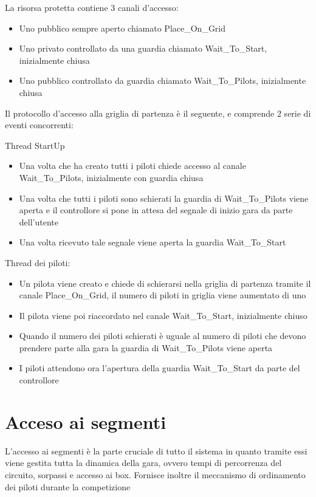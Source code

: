 \documentclass[a4paper,11pt, twoside]{book}
\begin{document}
      La risorsa protetta contiene 3 canali d'accesso:
      \begin{itemize}
	\item Uno pubblico sempre aperto chiamato Place\_On\_Grid
	\item Uno privato controllato da una guardia chiamato  Wait\_To\_Start, inizialmente chiusa
	\item Uno pubblico controllato da guardia chiamato Wait\_To\_Pilots, inizialmente chiusa
      \end{itemize}
      
      Il protocollo d'accesso alla griglia di partenza è il seguente, e comprende 2 serie di eventi
      concorrenti:
      
      Thread StartUp
      \begin{itemize}
	\item Una volta che ha creato tutti i piloti chiede accesso al canale Wait\_To\_Pilots,
	      inizialmente con guardia chiusa
	\item Una volta che tutti i piloti sono schierati la guardia di Wait\_To\_Pilots viene aperta e il controllore
	      si pone in attesa del segnale di inizio gara da parte dell'utente
	\item Una volta ricevuto tale segnale viene aperta la guardia Wait\_To\_Start
      \end{itemize}
      
      Thread dei piloti:
      \begin{itemize}
	\item Un pilota viene creato e chiede di schierarsi nella griglia di partenza tramite il canale Place\_On\_Grid,
              il numero di piloti in griglia viene aumentato di uno
	\item Il pilota viene poi riaccordato nel canale Wait\_To\_Start, inizialmente chiuso
	\item Quando il numero dei piloti schierati è uguale al numero di piloti che devono prendere parte alla gara
	      la guardia di Wait\_To\_Pilots viene aperta
	\item I piloti attendono ora l'apertura della guardia Wait\_To\_Start da parte del controllore
      \end{itemize}

	    
    \section{Acceso ai segmenti}
    \label{Accesso ai segmenti}
      L'accesso ai segmenti è la parte cruciale di tutto il sistema in quanto tramite essi viene gestita
      tutta la dinamica della gara, ovvero tempi di percorrenza del circuito, sorpassi e accesso ai box.
      Fornisce inoltre il meccanismo di ordinamento dei piloti durante la competizione
      
\end{document}
